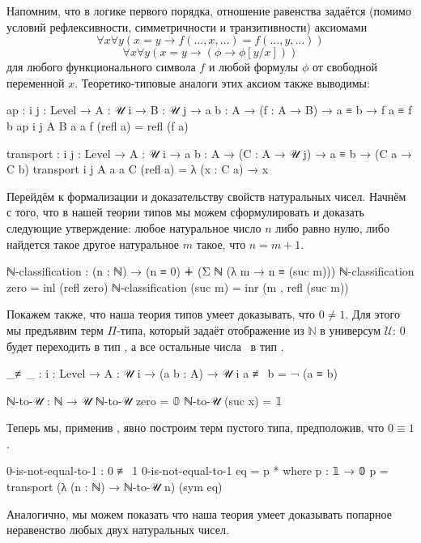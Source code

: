 \documentclass{article}[12pt]
\newcommand{\dash}{\textemdash\ }
\begin{document}
Напомним, что в логике первого порядка, отношение равенства задаётся (помимо условий
рефлексивности, симметричности и транзитивности) аксиомами
$$\forall x \forall y (x = y \rightarrow f(\dots, x, \dots) = f(\dots, y, \dots))$$
$$\forall x \forall y (x = y \rightarrow (\phi \rightarrow \phi[y/x]))$$
для любого функционального символа $f$ и любой формулы $\phi$ от свободной переменной $x$.
Теоретико-типовые аналоги этих аксиом также выводимы:
\begin{code}
ap : {i j : Level} → {A : 𝒰 i} → {B : 𝒰 j} → {a b : A} → (f : A → B)
     → a ≡ b → f a ≡ f b
ap {i} {j} {A} {B} {a} {a} f (refl a) = refl (f a)

transport : {i j : Level} → {A : 𝒰 i}  → {a b : A} → (C : A → 𝒰 j)
            → a ≡ b → (C a → C b)
transport {i} {j} {A} {a} {a} C (refl a) = λ (x : C a) → x
\end{code}

Перейдём к формализации и доказательству свойств натуральных чисел. Начнём с того, что в нашей теории типов
мы можем сформулировать и доказать следующие утверждение: любое натуральное число $n$ либо равно нулю,
либо найдется такое другое натуральное $m$ такое, что $n = m + 1$.
\begin{code}
ℕ-classification : (n : ℕ) → (n ≡ 0) ∔ (Σ ℕ (λ m → n ≡ (suc m)))
ℕ-classification zero = inl (refl zero)
ℕ-classification (suc m) = inr (m , refl (suc m))
\end{code}

Покажем также, что наша теория типов умеет доказывать, что $0 \neq 1$.
Для этого мы предъявим терм $\Pi$-типа, который задаёт отображение из $\mathbb N$ в
универсум $\mathcal U$: $0$ будет переходить в тип , а все остальные числа \dash в
тип .
\begin{code}
_≢_ : {i : Level} → {A : 𝒰 i} → (a b : A) → 𝒰 i
a ≢ b = ¬ (a ≡ b)

ℕ-to-𝒰 : ℕ → 𝒰
ℕ-to-𝒰 zero = 𝟘
ℕ-to-𝒰 (suc x) = 𝟙
\end{code}
Теперь мы, применив , явно построим терм пустого типа, предположив, что $0 \equiv 1$.
\begin{code}
0-is-not-equal-to-1 : 0 ≢ 1
0-is-not-equal-to-1 eq = p *
    where
        p : 𝟙 → 𝟘
        p = transport (λ (n : ℕ) → ℕ-to-𝒰 n) (sym eq)
\end{code}
Аналогично, мы можем показать что наша теория умеет доказывать попарное неравенство любых двух натуральных
чисел.
\end{document}
